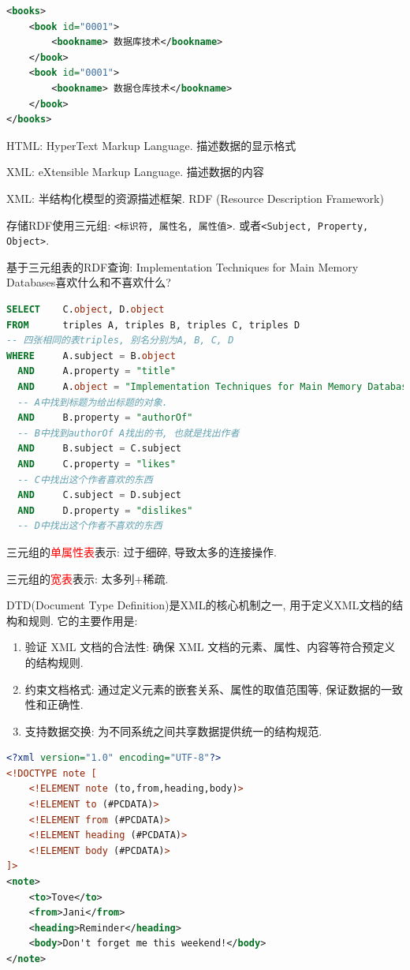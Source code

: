 \begin{lstlisting}[language=XML]
<books>
    <book id="0001">
        <bookname> 数据库技术</bookname>
    </book>
    <book id="0001">
        <bookname> 数据仓库技术</bookname>
    </book>
</books>
\end{lstlisting}

HTML: HyperText Markup Language. 描述数据的显示格式

XML: eXtensible Markup Language. 描述数据的内容

XML: 半结构化模型的资源描述框架. RDF (Resource Description Framework)

存储RDF使用三元组: \texttt{<标识符, 属性名, 属性值>}. 或者\texttt{<Subject, Property, Object>}.

基于三元组表的RDF查询:
Implementation Techniques for Main Memory Databases喜欢什么和不喜欢什么?
\begin{lstlisting}[language=SQL]
SELECT    C.object, D.object
FROM      triples A, triples B, triples C, triples D
-- 四张相同的表triples, 别名分别为A, B, C, D
WHERE     A.subject = B.object
  AND     A.property = "title"
  AND     A.object = "Implementation Techniques for Main Memory Databases"
  -- A中找到标题为给出标题的对象.
  AND     B.property = "authorOf"
  -- B中找到authorOf A找出的书, 也就是找出作者
  AND     B.subject = C.subject
  AND     C.property = "likes"
  -- C中找出这个作者喜欢的东西
  AND     C.subject = D.subject
  AND     D.property = "dislikes"
  -- D中找出这个作者不喜欢的东西
\end{lstlisting}

三元组的\textcolor{red}{单属性表}表示: 过于细碎, 导致太多的连接操作.

三元组的\textcolor{red}{宽表}表示: 太多列+稀疏.

DTD(Document Type Definition)是XML的核心机制之一, 用于定义XML文档的结构和规则.
它的主要作用是:
\begin{enumerate}
    \item 验证 XML 文档的合法性: 确保 XML 文档的元素、属性、内容等符合预定义的结构规则.
    \item 约束文档格式: 通过定义元素的嵌套关系、属性的取值范围等, 保证数据的一致性和正确性.
    \item 支持数据交换: 为不同系统之间共享数据提供统一的结构规范.
\end{enumerate}

\begin{lstlisting}[language=XML]
<?xml version="1.0" encoding="UTF-8"?>
<!DOCTYPE note [
    <!ELEMENT note (to,from,heading,body)>
    <!ELEMENT to (#PCDATA)>
    <!ELEMENT from (#PCDATA)>
    <!ELEMENT heading (#PCDATA)>
    <!ELEMENT body (#PCDATA)>
]>
<note>
    <to>Tove</to>
    <from>Jani</from>
    <heading>Reminder</heading>
    <body>Don't forget me this weekend!</body>
</note>
\end{lstlisting}

